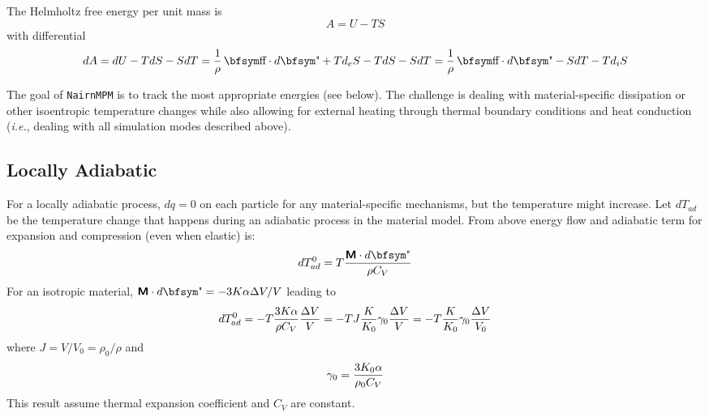 \documentclass[11pt]{article}
\newcommand{\tens}[1]{\boldsymbol{\mathsf{#1}}}
\begin{document}
The Helmholtz free energy per unit mass is
\begin{equation}%
     A = U - TS
\end{equation}%
with differential
\begin{equation}%
    dA = dU - TdS - SdT = {1\over \rho}\thinspace \st\cdot d\et + T d_eS - TdS - SdT
              = {1\over \rho}\thinspace \st\cdot d\et  - SdT - T d_iS
\end{equation}%

The goal of {\tt NairnMPM} is to track the most appropriate energies (see below). The challenge is dealing with material-specific dissipation or other isoentropic temperature changes while also allowing for external heating through thermal boundary conditions and heat conduction ({\em i.e.}, dealing with all simulation modes described above).

\subsection{Locally Adiabatic}

For a locally adiabatic process, $dq=0$ on each particle for any material-specific mechanisms, but the temperature might increase. Let $dT_{ad}$ be the temperature change that happens during an adiabatic process in the material model. From above energy flow and adiabatic term for expansion and compression (even when elastic) is:
\begin{equation}
    dT_{ad}^0 = T {\tens{M}\cdot d\et\over \rho C_V}
\end{equation}
For an isotropic material, $\tens{M}\cdot d\et = - 3K\alpha \Delta V/V$ leading to
\begin{equation}
    dT_{ad}^0 = -T {3K\alpha\over \rho C_V}{\Delta V\over V} = -T J {K\over K_0} \gamma_0 {\Delta V\over V} = -T {K\over K_0} \gamma_0 {\Delta V\over V_0}
\end{equation}
where $J = V/V_0 = \rho_0/ \rho$ and
\begin{equation}
    \gamma_0 = {3K_0\alpha\over \rho_0 C_V}      \label{gamzdef}
\end{equation}
This result assume thermal expansion coefficient and $C_V$ are constant.
\end{document}
